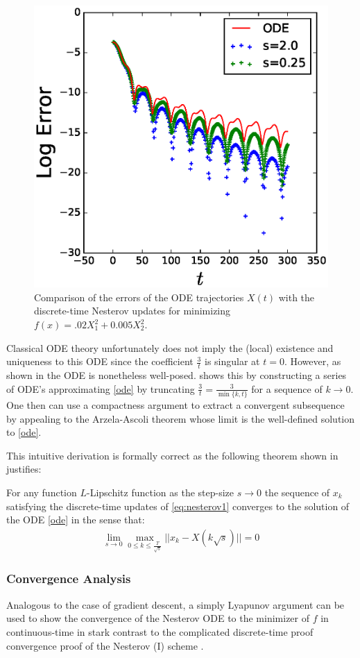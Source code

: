 \begin{figure}[!h]
\begin{center}
\includegraphics[width=0.5\linewidth]{Experiments/quadratic_errors_compare_annealed.eps}
\caption{Comparison of the errors of the ODE trajectories $X(t)$ with the discrete-time Nesterov updates for minimizing $f(x) = .02 X_1^2 + 0.005 X_2^2$.}
\end{center}
\end{figure}

Classical ODE theory unfortunately does not imply the (local) existence and uniqueness to this ODE since the coefficient $\frac{3}{t}$ is singular at $t=0$. However, as shown in \citet{su2014differential} the ODE is nonetheless well-posed. \citet{su2014differential} shows this by constructing a series of ODE's approximating \eqref{ode} by truncating $\frac{3}{t} = \frac{3}{\min \{ k, t \}}$ for a sequence of $k\to 0$. One then can use a compactness argument to extract a convergent subsequence by appealing to the Arzela-Ascoli theorem whose limit is the well-defined solution to \eqref{ode}.

This intuitive derivation is formally correct as the following theorem shown in \citet{su2014differential} justifies:
\begin{theorem}
    For any function $L$-Lipschitz function as the step-size $s \to 0$ the sequence of $x_k$ satisfying the discrete-time updates of \eqref{eq:nesterov1} converges to the solution of the ODE \eqref{ode} in the sense that: \\
    \begin{align*}
    \lim_{s \to 0} \max_{0 \leq k \leq \frac{T}{\sqrt{s}}} ||x_k-X(k\sqrt{s})|| = 0
    \end{align*}
\end{theorem}

\subsubsection{Convergence Analysis}
Analogous to the case of gradient descent, a simply Lyapunov argument can be used to show the convergence of the Nesterov ODE to the minimizer of $f$ in continuous-time in stark contrast to the complicated discrete-time proof convergence proof of the Nesterov (I) scheme \citep{su2014differential}.  

